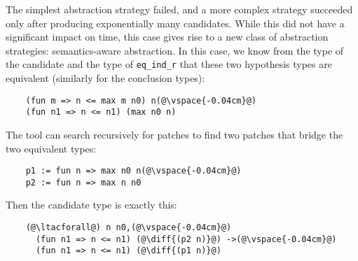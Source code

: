 The simplest abstraction strategy failed, and a more
complex strategy 
succeeded only after producing exponentially many candidates.
While this did not have a significant impact on time,
this case gives rise to a new class of abstraction strategies:
semantics-aware abstraction.
In this case, we know from the type of the candidate
and the type of \lstinline{eq_ind_r} that these two hypothesis types 
are equivalent (similarly for the conclusion types):




\begin{lstlisting}
    (fun m => n <= max m n0) n(@\vspace{-0.04cm}@)
    (fun n1 => n <= n1) (max n0 n)
\end{lstlisting}

The tool can search recursively for patches to find two patches that bridge the two equivalent
types:

\begin{lstlisting}
    p1 := fun n => max n0 n(@\vspace{-0.04cm}@)
    p2 := fun n => max n n0
\end{lstlisting}

Then the candidate type is exactly this:

\begin{lstlisting}
    (@\ltacforall@) n n0,(@\vspace{-0.04cm}@)
      (fun n1 => n <= n1) (@\diff{(p2 n)}@) ->(@\vspace{-0.04cm}@)
      (fun n1 => n <= n1) (@\diff{(p1 n)}@)
\end{lstlisting}

